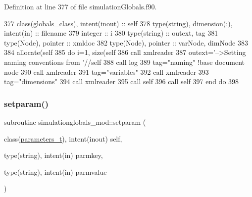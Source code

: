 Definition at line 377 of file simulation\+Globals.\+f90.


\begin{DoxyCode}
377     \textcolor{keywordtype}{class}(globals\_class), \textcolor{keywordtype}{intent(inout)} :: self
378     \textcolor{keywordtype}{type}(string), \textcolor{keywordtype}{dimension(:)}, \textcolor{keywordtype}{intent(in)} :: filename
379     \textcolor{keywordtype}{integer} :: i
380     \textcolor{keywordtype}{type}(string) :: outext, tag
381     \textcolor{keywordtype}{type}(Node), \textcolor{keywordtype}{pointer} :: xmldoc
382     \textcolor{keywordtype}{type}(Node), \textcolor{keywordtype}{pointer} :: varNode, dimNode
383 
384     \textcolor{keyword}{allocate}(self%
385     \textcolor{keywordflow}{do} i=1, \textcolor{keyword}{size}(self%
386         \textcolor{keyword}{call }xmlreader%
387         outext=\textcolor{stringliteral}{'-->Setting naming conventions from '}//self%
388         \textcolor{keyword}{call }log%
389         tag=\textcolor{stringliteral}{"naming"}          \textcolor{comment}{!base document node}
390         \textcolor{keyword}{call }xmlreader%
391         tag=\textcolor{stringliteral}{"variables"}
392         \textcolor{keyword}{call }xmlreader%
393         tag=\textcolor{stringliteral}{"dimensions"}
394         \textcolor{keyword}{call }xmlreader%
395         \textcolor{keyword}{call }self%
396         \textcolor{keyword}{call }self%
397 \textcolor{keywordflow}{    end do}
398 
\end{DoxyCode}
\mbox{\label{namespacesimulationglobals__mod_ada0b6ffc5e112afbd86cdaa8d9aa55d8}} 
\subsubsection{\texorpdfstring{setparam()}{setparam()}}
{\footnotesize\ttfamily subroutine simulationglobals\+\_\+mod\+::setparam (\begin{DoxyParamCaption}\item[{class(\mbox{\hyperlink{structsimulationglobals__mod_1_1parameters__t}{parameters\+\_\+t}}), intent(inout)}]{self,  }\item[{type(string), intent(in)}]{parmkey,  }\item[{type(string), intent(in)}]{parmvalue }\end{DoxyParamCaption})\hspace{0.3cm}{\ttfamily [private]}}




